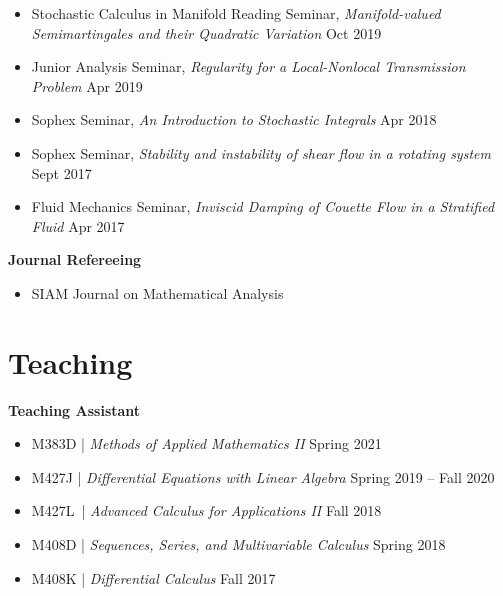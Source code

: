 \documentclass[margin,line]{res}
\begin{document}
\begin{resume}
\begin{itemize}[leftmargin=0.15in, label=$\sqbullet$]
    \item Stochastic Calculus in Manifold Reading Seminar, 
    \textit{Manifold-valued Semimartingales and their Quadratic Variation}
    \hfill Oct 2019
    
    \item Junior Analysis Seminar, 
    \textit{Regularity for a Local-Nonlocal Transmission Problem }
    \hfill Apr 2019
    
    \item Sophex Seminar, 
    \textit{An Introduction to Stochastic Integrals} 
    \hfill Apr 2018
    
    \item Sophex Seminar, 
    \textit{Stability and instability of shear flow in a rotating system} 
    \hfill Sept 2017
    
    \item Fluid Mechanics Seminar, 
    \textit{Inviscid Damping of Couette Flow in a Stratified Fluid} 
    \hfill Apr 2017 
    
\end{itemize}

\nvspace 
{\bf Journal Refereeing}
\vvspace

\begin{itemize}[leftmargin=0.15in, label=$\sqbullet$]
    \item SIAM Journal on Mathematical Analysis
\end{itemize}

\section{\sc Teaching}

{\bf Teaching Assistant}
\vvspace

\begin{itemize}[leftmargin=0.15in, label=$\sqbullet$]
    \item M383D \hspace{0.005in}| \textit{Methods of Applied Mathematics II} \hfill Spring 2021
    \item M427J \hspace{0.04in}| \textit{Differential Equations with Linear Algebra} \hfill Spring 2019 -- Fall 2020
    \item M427L \,| \textit{Advanced Calculus for Applications II} \hfill Fall 2018
    \item M408D \hspace{0.002in}| \textit{Sequences, Series, and Multivariable Calculus} \hfill Spring 2018
    \item M408K | \textit{Differential Calculus} \hfill Fall 2017
\end{itemize}


\end{resume}
\end{document}
